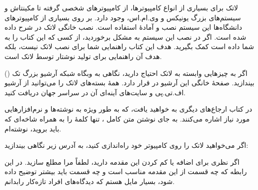 \bigskip
\noindent 
لاتک برای بسیاری از انواع کامپیوترها، از کامپیوترهای شخصی گرفته تا مکینتاش و سیستم‌های بزرگ یونیکس و وی.ام.اس، وجود دارد. بر روی بسیاری از کامپیوترهای دانشگاه‌ها این سیستم نصب و آمادهٔ استفاده است. نصب خانگی لاتک در 
\guide
شرح داده شده است. اگر در نصب این سیستم به مشکل برخوردید، از کسی که این کتاب را به شما داده است کمک بگیرید. هدف این کتاب راهنمایی شما برای نصب لاتک نیست، بلکه هدف آن راهنمایی برای تولید نوشتار توسط لاتک است.

\bigskip
\noindent 
اگر به چیزهایی وابسته به لاتک احتیاج دارید، نگاهی به وبگاه شبکه آرشیو بزرگ تک 
()
بیندازید. صفحهٔ خانگی این آرشیو در 
قرار دارد. 
همهٔ بسته‌های لاتک را می‌توانید از آرشیو اف.تی.پی 
و سایت‌های آینه‌ای آن در سراسر جهان دریافت کنید.

در کتاب ارجاع‌های دیگری به 
خواهید یافت، که به طور ویژه به نوشته‌ها و نرم‌افزارهایی مورد نیاز اشاره می‌کنند. به جای نوشتن متن کامل 
،
تنها کلمهٔ 
را به همراه شاخه‌ای که باید بروید، نوشته‌ام.

اگر می‌خواهید لاتک را روی کامپیوتر خود راه‌اندازی کنید، به آدرس زیر نگاهی بیندازید:

\setRL


\noindent 
اگر نظری برای اضافه یا کم کردن این مقدمه دارید، لطفاً مرا مطلع سازید.  در این رابطه که چه قسمت از این مقدمه مناسب است و چه قسمت باید بیشتر توضیح داده شود، بسیار مایل هستم که دیدگاه‌های افراد تازه‌کار رابدانم.

\bigskip

\begin{latin}
\begin{verse}
%
\end{verse}
\end{latin}


%


